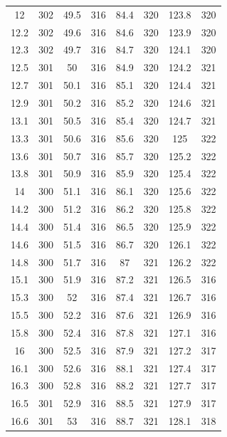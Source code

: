 \documentclass[12pt]{ctexart}
\numberwithin{equation}{section}
\begin{document}
\begin{longtable}{cc|cc|cc|cc}
12  &  302  &  49.5  &  316  &  84.4  &  320  &  123.8  &  320  \\
12.2  &  302  &  49.6  &  316  &  84.6  &  320  &  123.9  &  320  \\
12.3  &  302  &  49.7  &  316  &  84.7  &  320  &  124.1  &  320  \\
12.5  &  301  &  50  &  316  &  84.9  &  320  &  124.2  &  321  \\
12.7  &  301  &  50.1  &  316  &  85.1  &  320  &  124.4  &  321  \\
12.9  &  301  &  50.2  &  316  &  85.2  &  320  &  124.6  &  321  \\
13.1  &  301  &  50.5  &  316  &  85.4  &  320  &  124.7  &  321  \\
13.3  &  301  &  50.6  &  316  &  85.6  &  320  &  125  &  322  \\
13.6  &  301  &  50.7  &  316  &  85.7  &  320  &  125.2  &  322  \\
13.8  &  301  &  50.9  &  316  &  85.9  &  320  &  125.4  &  322  \\
14  &  300  &  51.1  &  316  &  86.1  &  320  &  125.6  &  322  \\
14.2  &  300  &  51.2  &  316  &  86.2  &  320  &  125.8  &  322  \\
14.4  &  300  &  51.4  &  316  &  86.5  &  320  &  125.9  &  322  \\
14.6  &  300  &  51.5  &  316  &  86.7  &  320  &  126.1  &  322  \\
14.8  &  300  &  51.7  &  316  &  87  &  321  &  126.2  &  322  \\
15.1  &  300  &  51.9  &  316  &  87.2  &  321  &  126.5  &  316  \\
15.3  &  300  &  52  &  316  &  87.4  &  321  &  126.7  &  316  \\
15.5  &  300  &  52.2  &  316  &  87.6  &  321  &  126.9  &  316  \\
15.8  &  300  &  52.4  &  316  &  87.8  &  321  &  127.1  &  316  \\
16  &  300  &  52.5  &  316  &  87.9  &  321  &  127.2  &  317  \\
16.1  &  300  &  52.6  &  316  &  88.1  &  321  &  127.4  &  317  \\
16.3  &  300  &  52.8  &  316  &  88.2  &  321  &  127.7  &  317  \\
16.5  &  301  &  52.9  &  316  &  88.5  &  321  &  127.9  &  317  \\
16.6  &  301  &  53  &  316  &  88.7  &  321  &  128.1  &  318  \\

\end{longtable}
\end{document}
